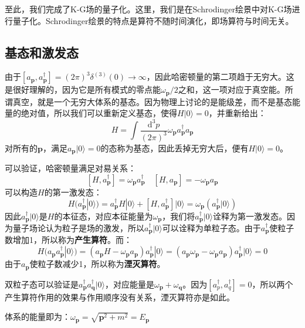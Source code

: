 \documentclass{book}
\begin{document}
至此，我们完成了K-G场的量子化。这里，我们是在Schrodinger绘景中对K-G场进行量子化。Schrodinger绘景的特点是算符不随时间演化，即场算符与时间无关。
\subsection{基态和激发态}
由于$[a_\mathbf{p},a_\mathbf{p}^\dagger]=(2\pi)^3\delta^{(3)}(0)\to\infty$，因此哈密顿量的第二项趋于无穷大。这是很好理解的，因为它是所有模式的零点能$\omega_{\mathbf{p}}/2$之和，这一项对应于真空能。所谓真空，就是一个无穷大体系的基态。因为物理上讨论的是能级差，而不是基态能量的绝对值，所以我们可以重新定义基态，使得$H|0\rangle=0$，并重新给出：
$$
H=\int \frac{\mathrm{d}^3p}{(2\pi)^3}\omega_{\mathbf{p}}a_\mathbf{p}^\dagger a_{\mathbf{p}}
$$
对所有的$\mathbf{p}$，满足$a_{\mathbf{p}}|0\rangle=0$的态称为基态，因此丢掉无穷大后，便有$H|0\rangle=0$。

可以验证，哈密顿量满足对易关系：
$$
[H,a_\mathbf{p}^\dagger]=\omega_{\mathbf{p}}a_\mathbf{p}^\dagger\quad  [H,a_\mathbf{p}]=-\omega_{\mathbf{p}}a_\mathbf{p}
$$
可以构造$H$的第一激发态：
$$
H(a_\mathbf{p}^\dagger|0\rangle)=a_\mathbf{p}^\dagger H|0\rangle+[H,a_\mathbf{p}^\dagger]|0\rangle=\omega_\mathbf{p}(a_\mathbf{p}^\dagger|0\rangle)
$$
因此$a_\mathbf{p}^\dagger|0\rangle$是$H$的本征态，对应本征能量为$\omega_\mathbf{p}$，我们将$a_\mathbf{p}^\dagger|0\rangle$诠释为第一激发态。因为量子场论认为粒子是场的激发，所以$a_\mathbf{p}^\dagger|0\rangle$可以诠释为单粒子态。由于$a_\mathbf{p}^\dagger$使粒子数增加1，所以称为\textbf{产生算符}。而：
$$
H(a_\mathbf{p}a_\mathbf{p}^\dagger|0\rangle)=(a_\mathbf{p}H-\omega_\mathbf{p}a_\mathbf{p})a_\mathbf{p}^\dagger |0\rangle=(a_\mathbf{p}\omega_\mathbf{p}-\omega_\mathbf{p}a_\mathbf{p})a_\mathbf{p}^\dagger |0\rangle=0
$$
由于$a_\mathbf{p}$使粒子数减少1，所以称为\textbf{湮灭算符}。

双粒子态可以验证是$a_{\mathbf{p}}^\dagger a_{\mathbf{q}}^\dagger|0\rangle$，对应能量是$\omega_{\mathbf{p}}+\omega_{\mathbf{q}}$。因为$[a_p^\dagger,a_q^\dagger]=0$，所以两个产生算符作用的效果与作用顺序没有关系，湮灭算符亦是如此。

体系的能量即为：$\omega_{\mathbf{p}}=\sqrt{\mathbf{p}^2+m^2}=E_\mathbf{p}$
\end{document}
